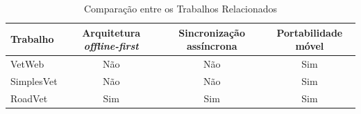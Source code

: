 \begin{table}[H]
    \centering
    \caption{Comparação entre os Trabalhos Relacionados}
    \label{tab:trabalhos-relacionados}
    \begin{tabular}{lccc}
        \toprule
        \textbf{Trabalho} & \textbf{Arquitetura \textit{offline-first}} & \textbf{Sincronização assíncrona} & \textbf{Portabilidade móvel} \\
        \midrule
        VetWeb     & Não & Não & Sim \\
        SimplesVet & Não & Não & Sim \\
        RoadVet    & Sim & Sim & Sim \\
        \bottomrule
    \end{tabular}
\end{table}


